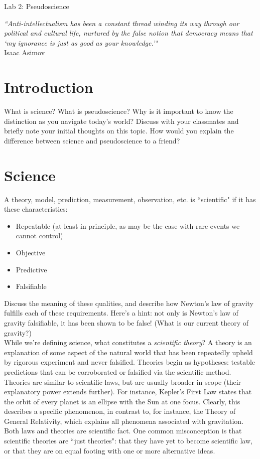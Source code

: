 \documentclass[12pt]{article}
\begin{document}
 \begin{center}
{\huge Lab 2: Pseudoscience}\\
\end{center} 

\begin{center}
\noindent \textit{``Anti-intellectualism has been a constant thread winding its way through our political and cultural life, nurtured by the false notion that democracy means that `my ignorance is just as good as your knowledge.'"}\\ 
\vspace{2mm}
Isaac Asimov
\end{center}

\section{Introduction}
What is science? What is pseudoscience? Why is it important to know the distinction as you navigate today's world? Discuss with your classmates and briefly note your initial thoughts on this topic. How would you explain the difference between science and pseudoscience to a friend?

\section{Science}
A theory, model, prediction, measurement, observation, etc. is ``scientific" if it has these characteristics:
\begin{itemize}
\item Repeatable (at least in principle, as may be the case with rare events we cannot control)
\item Objective
\item Predictive
\item Falsifiable
\end{itemize}

\noindent Discuss the meaning of these qualities, and describe how Newton's law of gravity fulfills each of these requirements. Here's a hint: not only is Newton's law of gravity falsifiable, it has been shown to be false! (What is our current theory of gravity?) \\

\noindent While we're defining science, what constitutes a \textit{scientific theory}? A theory is an explanation of some aspect of the natural world that has been repeatedly upheld by rigorous experiment and never falsified. Theories begin as hypotheses: testable predictions that can be corroborated or falsified via the scientific method. Theories are similar to scientific laws, but are usually broader in scope (their explanatory power extends further). For instance, Kepler's First Law states that the orbit of every planet is an ellipse with the Sun at one focus. Clearly, this describes a specific phenomenon, in contrast to, for instance, the Theory of General Relativity, which explains all phenomena associated with gravitation. Both laws and theories are scientific fact. One common misconception is that scientific theories are ``just theories": that they have yet to become scientific law, or that they are on equal footing with one or more alternative ideas. 
\end{document}
